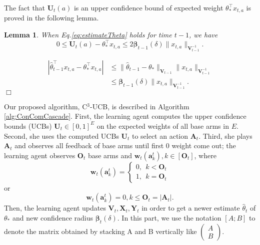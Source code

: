 \documentclass{article}
\newcommand{\bbeta}{\boldsymbol{\beta}}
\newcommand{\bA}{\mathbf{A}}
\newcommand{\ba}{\mathbf{a}}
\newcommand{\bO}{\mathbf{O}}
\newcommand{\bU}{\mathbf{U}}
\newcommand{\bV}{\mathbf{V}}
\newcommand{\bw}{\mathbf{w}}
\newcommand{\bX}{\mathbf{X}}
\newcommand{\bY}{\mathbf{Y}}
\newcommand{\abs}[1]{\left| #1 \right|}
\newcommand{\norm}[1]{\| #1 \|}
\newtheorem{lemma}[theorem]{Lemma}%
\newenvironment{proof}{\noindent {\textbf{Proof. }}}{$\Box$ \medskip}
\begin{document}
The fact that $\bU_t(a)$ is an upper confidence bound of expected weight $\theta_*^{\top}x_{t,a}$ is proved in the following lemma.
\begin{lemma}
\label{lem:estimateU}
When Eq.\eqref{eq:estimateTheta} holds for time $t-1$, we have
$$
0 \leq \bU_t(a) - \theta_{\ast}^{\top}x_{t,a} \leq 2\bbeta_{t-1}(\delta)\norm{x_{t,a}}_{\bV_{t-1}^{-1}}.
$$
\end{lemma}
\begin{proof}
\begin{align*}
\abs{\hat{\theta}_{t-1}^{\top}x_{t,a} - \theta_{\ast}^{\top}x_{t,a}} &\leq \norm{\hat{\theta}_{t-1} - \theta_{\ast}}_{\bV_{t-1}} \norm{x_{t,a}}_{\bV_{t-1}^{-1}} \\
&\leq \bbeta_{t-1}(\delta)\norm{x_{t,a}}_{\bV_{t-1}^{-1}}.
\end{align*}
\end{proof}

Our proposed algorithm, C$^3$-UCB, is described in Algorithm \ref{alg:ConComCascade}. 
First, the learning agent 
	computes the upper confidence bounds (UCBs) $\bU_t \in [0,1]^{E}$ on the expected weights of all base arms in $E$. 
Second, she uses the computed UCBs $\bU_t$ to select an action $\bA_t$. 
Third, she plays $\bA_t$ and observes all feedback of base arms until first $0$ weight come out; the learning agent observes $\bO_t$ base arms and $\bw_t(\ba_k^t), k \in [\bO_t]$, where 
$$
\bw_t(\ba_{k}^t) = \begin{cases} 0, ~~k < \bO_t\\ 1, ~~k = \bO_t\end{cases}
$$ 
or
$$
\bw_t(\ba_k^t) = 0, k \leq \bO_t = \abs{\bA_t}.
$$
Then, the learning agent updates $\bV_t, \bX_t, \bY_t$ in order to get a newer estimate $\hat{\theta}_t$ of $\theta_*$ and new confidence radius $\bbeta_t(\delta)$. In this part, we use the notation $[A; B]$ to denote the matrix obtained by stacking A and B vertically like
 $\begin{pmatrix} A\\ B\end{pmatrix}$.
\end{document}
